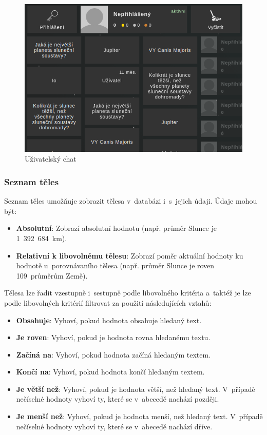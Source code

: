 \documentclass[a4paper,12pt]{article}
\begin{document}
\begin{figure}[H]
\begin{center}
\includegraphics[width=350pt]{Images/Overview.png}
\caption{Uživatelský chat}
\label{BodiesList}
\end{center}
\end{figure}


\subsubsection{Seznam těles}

Seznam těles umožňuje zobrazit tělesa v~databázi i~s~jejich údaji. Údaje mohou být:

\begin{itemize}
\item \textbf{Absolutní}: Zobrazí absolutní hodnotu (např. průměr Slunce je 1~392~684~km).
\item \textbf{Relativní k libovolnému tělesu}: Zobrazí poměr aktuální hodnoty ku hodnotě u~porovnávaního tělesa (např. průměr Slunce je roven 109~průměrům Země).
\end{itemize}

Tělesa lze řadit vzestupně i~sestupně podle libovolného kritéria a~taktéž je lze podle libovolných kritérií filtrovat za použití následujících vztahů:

\begin{itemize}
\item \textbf{Obsahuje}: Vyhoví, pokud hodnota obsahuje hledaný text.
\item \textbf{Je roven}: Vyhoví, pokud je hodnota rovna hledanému textu.
\item \textbf{Začíná na}: Vyhoví, pokud hodnota začíná hledaným textem.
\item \textbf{Končí na}: Vyhoví, pokud hodnota končí hledaným textem.
\item \textbf{Je větší než}: Vyhoví, pokud je hodnota větší, než hledaný text. V~případě nečíselné hodnoty vyhoví ty, které se v~abecedě nachází později.
\item \textbf{Je menší než}: Vyhoví, pokud je hodnota menší, než hledaný text. V~případě nečíselné hodnoty vyhoví ty, které se v~abecedě nachází dříve.
\end{itemize} 
\end{document}
